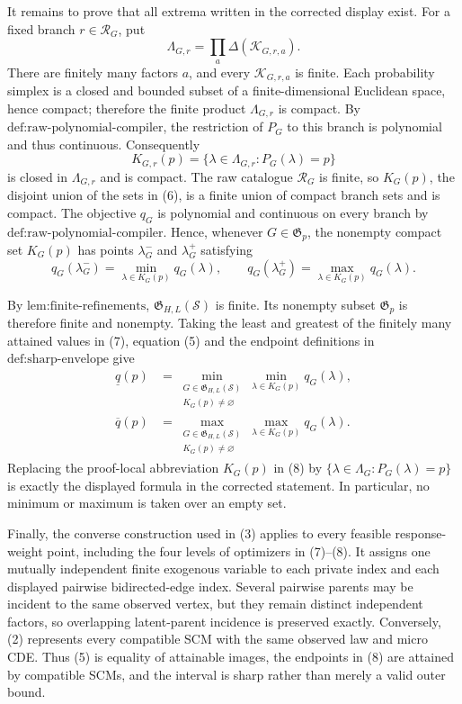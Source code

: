 It remains to prove that all extrema written in the corrected display exist.  For a fixed branch \(r\in\mathcal R_G\), put
\[
\Lambda_{G,r}=\prod_a\Delta(\mathcal K_{G,r,a}).
\]
There are finitely many factors \(a\), and every \(\mathcal K_{G,r,a}\) is finite.  Each probability simplex is a closed and bounded subset of a finite-dimensional Euclidean space, hence compact; therefore the finite product \(\Lambda_{G,r}\) is compact.  By \(\text{def:raw-polynomial-compiler}\), the restriction of \(P_G\) to this branch is polynomial and thus continuous.  Consequently
\[
K_{G,r}(p)=\{\lambda\in\Lambda_{G,r}:P_G(\lambda)=p\}
\tag{6}
\]
is closed in \(\Lambda_{G,r}\) and is compact.  The raw catalogue \(\mathcal R_G\) is finite, so \(K_G(p)\), the disjoint union of the sets in (6), is a finite union of compact branch sets and is compact.  The objective \(q_G\) is polynomial and continuous on every branch by \(\text{def:raw-polynomial-compiler}\).  Hence, whenever \(G\in\mathfrak G_p\), the nonempty compact set \(K_G(p)\) has points \(\lambda_G^-\) and \(\lambda_G^+\) satisfying
\[
q_G(\lambda_G^-)=\min_{\lambda\in K_G(p)}q_G(\lambda),
\qquad
q_G(\lambda_G^+)=\max_{\lambda\in K_G(p)}q_G(\lambda).
\tag{7}
\]

By \(\text{lem:finite-refinements}\), \(\mathfrak G_{H,L}(\mathcal S)\) is finite.  Its nonempty subset \(\mathfrak G_p\) is therefore finite and nonempty.  Taking the least and greatest of the finitely many attained values in (7), equation (5) and the endpoint definitions in \(\text{def:sharp-envelope}\) give
\[
\begin{aligned}
\underline q(p)
&=\min_{\substack{G\in\mathfrak G_{H,L}(\mathcal S)\\K_G(p)\ne\varnothing}}
  \min_{\lambda\in K_G(p)}q_G(\lambda),\\
\overline q(p)
&=\max_{\substack{G\in\mathfrak G_{H,L}(\mathcal S)\\K_G(p)\ne\varnothing}}
  \max_{\lambda\in K_G(p)}q_G(\lambda).
\end{aligned}
\tag{8}
\]
Replacing the proof-local abbreviation \(K_G(p)\) in (8) by \(\{\lambda\in\Lambda_G:P_G(\lambda)=p\}\) is exactly the displayed formula in the corrected statement.  In particular, no minimum or maximum is taken over an empty set.

Finally, the converse construction used in (3) applies to every feasible response-weight point, including the four levels of optimizers in (7)--(8).  It assigns one mutually independent finite exogenous variable to each private index and each displayed pairwise bidirected-edge index.  Several pairwise parents may be incident to the same observed vertex, but they remain distinct independent factors, so overlapping latent-parent incidence is preserved exactly.  Conversely, (2) represents every compatible SCM with the same observed law and micro CDE.  Thus (5) is equality of attainable images, the endpoints in (8) are attained by compatible SCMs, and the interval is sharp rather than merely a valid outer bound.
